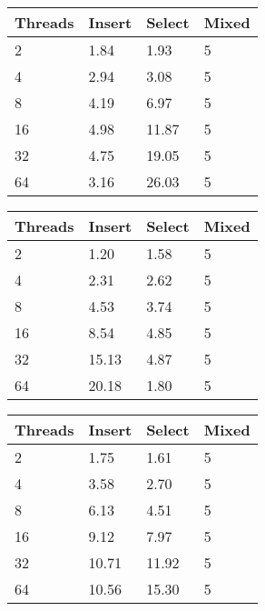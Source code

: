 \documentclass[conference, compsoc]{IEEEtran}
\begin{document}
\par\vspace{\baselineskip}
\begin{center}
 \label{tab:omdbScaling}
  \begin{tabular}{  l  l  l  l }
    \midrule
    \bf Threads & \bf Insert & \bf Select & \bf Mixed \\ \midrule
     2 & 1.84 & 1.93 & 5 \\ \midrule
     4 & 2.94 & 3.08 & 5 \\ \midrule
     8 & 4.19 & 6.97 & 5 \\ \midrule
     16 & 4.98 & 11.87 & 5 \\ \midrule
     32 & 4.75 & 19.05 & 5 \\ \midrule
     64 & 3.16 & 26.03 & 5 \\ \midrule
  \end{tabular}
\end{center}

\par\vspace{\baselineskip}
\begin{center}
 \label{tab:memsqlScaling}
  \begin{tabular}{  l  l  l  l }
    \midrule
    \bf Threads & \bf Insert & \bf Select & \bf Mixed \\ \midrule
     2 & 1.20 & 1.58 & 5 \\ \midrule
     4 & 2.31 & 2.62 & 5 \\ \midrule
     8 & 4.53 & 3.74 & 5 \\ \midrule
     16 & 8.54 & 4.85 & 5 \\ \midrule
     32 & 15.13 & 4.87 & 5 \\ \midrule
     64 & 20.18 & 1.80 & 5 \\ \midrule
  \end{tabular}
\end{center}

\par\vspace{\baselineskip}
\begin{center}
 \label{tab:voltScaling}
  \begin{tabular}{  l  l  l  l }
    \midrule
    \bf Threads & \bf Insert & \bf Select & \bf Mixed \\ \midrule
     2 & 1.75 & 1.61 & 5 \\ \midrule
     4 & 3.58 & 2.70 & 5 \\ \midrule
     8 & 6.13 & 4.51 & 5 \\ \midrule
     16 & 9.12 & 7.97 & 5 \\ \midrule
     32 & 10.71 & 11.92 & 5 \\ \midrule
     64 & 10.56 & 15.30 & 5 \\ \midrule
  \end{tabular}
\end{center}
\end{document}
